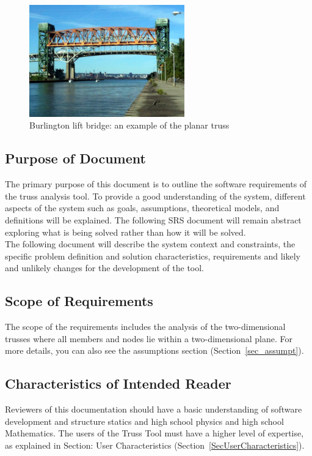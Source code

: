 \documentclass[12pt]{article}
\begin{document}
\begin{figure}[h!]
\begin{center}
 \includegraphics[width=0.6\textwidth]{bridge.jpg}
\caption{Burlington lift bridge: an example of the planar truss}
\label{Fig_bridge} 
\end{center}
\end{figure}

\subsection{Purpose of Document}
{The primary purpose of this document is to outline the software requirements of the truss analysis tool. To provide a good understanding of the system, different aspects of the system such as  goals, assumptions, theoretical models, and definitions will be explained.  The following SRS document will remain abstract exploring what is being solved rather than how it will be solved.\\
The following document will describe the system context and constraints, the specific problem definition and solution characteristics, requirements and likely and unlikely changes for the 
development of the tool.}

\subsection{Scope of Requirements} 
{The scope of the requirements includes the analysis of the two-dimensional trusses where all members and nodes lie within a two-dimensional plane. For more details, you can also see the assumptions section  (Section~\ref{sec_assumpt}). }

\subsection{Characteristics of Intended Reader} \label{sec_IntendedReader}
Reviewers of this documentation should have a basic understanding of software development and structure statics and high school physics and high school Mathematics.  The users of the Truss Tool must have a higher level of expertise, as explained in Section: User Characteristics (Section~\ref{SecUserCharacteristics}). 
\end{document}
